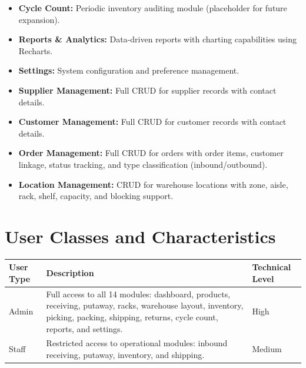 \documentclass[12pt,a4paper]{report}
\begin{document}
\begin{itemize}
    \item \textbf{Cycle Count:} Periodic inventory auditing module (placeholder for future expansion).
    \item \textbf{Reports \& Analytics:} Data-driven reports with charting capabilities using Recharts.
    \item \textbf{Settings:} System configuration and preference management.
    \item \textbf{Supplier Management:} Full CRUD for supplier records with contact details.
    \item \textbf{Customer Management:} Full CRUD for customer records with contact details.
    \item \textbf{Order Management:} Full CRUD for orders with order items, customer linkage, status tracking, and type classification (inbound/outbound).
    \item \textbf{Location Management:} CRUD for warehouse locations with zone, aisle, rack, shelf, capacity, and blocking support.
\end{itemize}

\section{User Classes and Characteristics}
\begin{table}[h!]
    \centering
    \renewcommand{\arraystretch}{1.5}
    \begin{tabularx}{\textwidth}{|l|X|l|}
        \hline
        \textbf{User Type} & \textbf{Description} & \textbf{Technical Level} \\
        \hline
        Admin & Full access to all 14 modules: dashboard, products, receiving, putaway, racks, warehouse layout, inventory, picking, packing, shipping, returns, cycle count, reports, and settings. & High \\
        \hline
        Staff & Restricted access to operational modules: inbound receiving, putaway, inventory, and shipping. & Medium \\
        \hline
    \end{tabularx}
\end{table}
\end{document}
